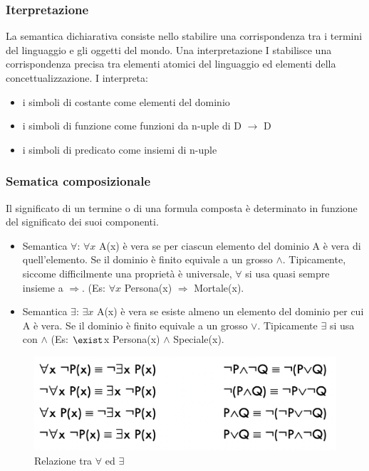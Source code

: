 \documentclass{article}
\begin{document}
\subsubsection{Iterpretazione}
La semantica dichiarativa consiste nello stabilire una corrispondenza tra i termini del linguaggio e gli oggetti del mondo. \newline
Una interpretazione I stabilisce una corrispondenza precisa tra elementi atomici del linguaggio ed elementi della concettualizzazione. I interpreta:
\begin{itemize}
    \item i simboli di costante come elementi del dominio
    \item i simboli di funzione come funzioni da n-uple di D $\rightarrow$ D
    \item i simboli di predicato come insiemi di n-uple
\end{itemize}
\subsubsection{Sematica composizionale}
Il significato di un termine o di una formula composta è determinato in funzione del significato dei suoi componenti.
\begin{itemize}
    \item Semantica $\forall$:  $\forall x$ A(x) è vera se per ciascun elemento del dominio A è vera di quell’elemento. Se il dominio è finito equivale a un grosso $\land$. Tipicamente, siccome difficilmente una proprietà è universale, $\forall$ si usa quasi sempre insieme a $\Rightarrow$. (Es: $\forall x$ Persona(x) $\Rightarrow$ Mortale(x).
    \item Semantica $\exists$: $\exists x$ A(x) è vera se esiste almeno un elemento del dominio per cui A è vera. Se il dominio è finito equivale a un grosso $\lor$. Tipicamente $\exists$ si usa con $\land$ (Es: $\exist$x Persona(x) $\land$ Speciale(x).
\end{itemize}
\begin{figure}[h!]
\centering
\includegraphics[scale=0.3]{Images/foarallexistsrelation.png}
\caption{Relazione tra $\forall$ ed $\exists$}
\end{figure}
\end{document}
